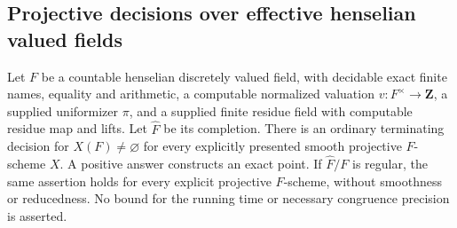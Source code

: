\subsection{Projective decisions over effective henselian valued fields}
\label{C:henselian-projective-subsection}

\begin{lemma}
\label{C:henselian-projective-decisions}
Let $F$ be a countable henselian discretely valued field, with
decidable exact finite names, equality and arithmetic, a computable normalized
valuation $v:F^\times\to\mathbf Z$, a supplied uniformizer $\pi$,
and a supplied finite residue field with computable residue map and
lifts. Let $\widehat F$ be its completion.
There is an ordinary terminating decision for $X(F)\ne\varnothing$
for every explicitly presented smooth projective $F$-scheme $X$.
A positive answer constructs an exact point.
If $\widehat F/F$ is regular, the same assertion holds for every
explicit projective $F$-scheme, without smoothness or reducedness.
No bound for the running time or necessary congruence precision is asserted.
\end{lemma}
